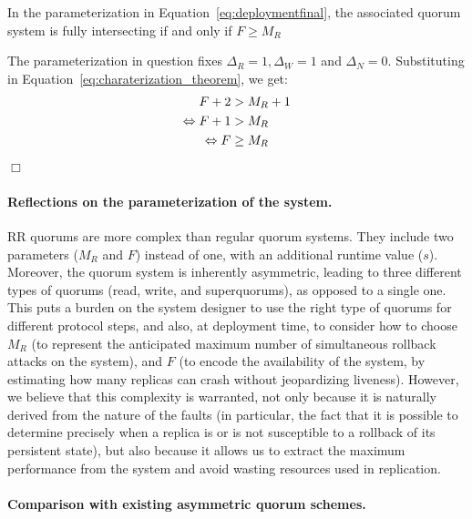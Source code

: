 \begin{corollary}
    In the parameterization in
    Equation~\ref{eq:deploymentfinal}, the associated quorum
    system is fully intersecting if and only if $F \geq M_R$
\end{corollary}
\begin{dem}
    The parameterization in question fixes $\Delta_R = 1,
    \Delta_W = 1$ and $\Delta_N = 0$. Substituting in
    Equation~\ref{eq:charaterization_theorem}, we get:
    \begin{align*}
        F + 2 &> M_R + 1 \\
        \Leftrightarrow F + 1 &> M_R \\
        \Leftrightarrow F &\geq M_R
    \end{align*}
    \hfill\ensuremath{\Box}\vspace{2em}
\end{dem}

\paragraph{Reflections on the parameterization of the system.}
\ac{RR} quorums are more complex than regular
quorum systems. They include two parameters ($M_R$ and $F$) instead of
one, with an additional runtime value ($s$). Moreover, the quorum
system is inherently asymmetric, leading to three different types of
quorums (read, write, and superquorums), as opposed to a single one.
This puts a burden on the system designer to use the right type of quorums for
different protocol steps, and also, at deployment time, to consider how to
choose $M_R$ (to represent the anticipated maximum number of simultaneous rollback
attacks on the system), and $F$
(to encode the availability of the system, by estimating how many replicas
can crash without jeopardizing liveness).
%
However, we believe that this complexity is warranted, not only
because it is naturally derived from the nature of the faults (in
particular, the fact that it is possible to determine precisely when a
replica is or is not susceptible to a rollback of its persistent
state), but also because it allows us to extract the maximum
performance from the system and avoid wasting resources used in
replication.

\paragraph{Comparison with existing asymmetric quorum schemes.}

